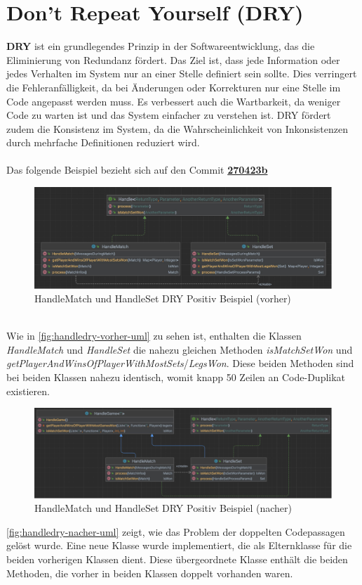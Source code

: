 \section{Don't Repeat Yourself (DRY)}
\textbf{\acf{DRY}} ist ein grundlegendes Prinzip in der Softwareentwicklung, das die Eliminierung von Redundanz fördert. Das Ziel ist, dass jede Information oder jedes Verhalten im System nur an einer Stelle definiert sein sollte. Dies verringert die Fehleranfälligkeit, da bei Änderungen oder Korrekturen nur eine Stelle im Code angepasst werden muss. Es verbessert auch die Wartbarkeit, da weniger Code zu warten ist und das System einfacher zu verstehen ist. DRY fördert zudem die Konsistenz im System, da die Wahrscheinlichkeit von Inkonsistenzen durch mehrfache Definitionen reduziert wird.\\\\
Das folgende Beispiel bezieht sich auf den Commit \textbf{\href{https://github.com/P3lina/ASE-Project/commit/270423b35cf9a364a2392e71870afeed7a87e809}{270423b}}\\
\begin{figure}[ht]
    \centering
    \includegraphics[width=0.85\linewidth]{Bilder/HandleDRYUML-vorher.png}
    \caption{HandleMatch und HandleSet DRY Positiv Beispiel (vorher)}
    \label{fig:handledry-vorher-uml}
\end{figure}\\
Wie in \autoref{fig:handledry-vorher-uml} zu sehen ist, enthalten die Klassen \textit{HandleMatch} und \textit{HandleSet} die nahezu gleichen Methoden \textit{isMatchSetWon} und \textit{getPlayerAndWinsOfPlayerWithMostSets}/\textit{LegsWon}. Diese beiden Methoden sind bei beiden Klassen nahezu identisch, womit knapp 50 Zeilen an Code-Duplikat existieren.\newpage
\begin{figure}[ht]
    \centering
    \includegraphics[width=1\linewidth]{Bilder/HandleDRYUML-nacher.png}
    \caption{HandleMatch und HandleSet DRY Positiv Beispiel (nacher)}
    \label{fig:handledry-nacher-uml}
\end{figure}
\autoref{fig:handledry-nacher-uml} zeigt, wie das Problem der doppelten Codepassagen gelöst wurde. Eine neue Klasse wurde implementiert, die als Elternklasse für die beiden vorherigen Klassen dient. Diese übergeordnete Klasse enthält die beiden Methoden, die vorher in beiden Klassen doppelt vorhanden waren.

